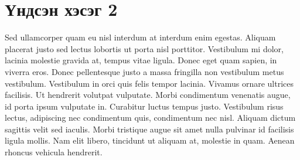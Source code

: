 
\section{Үндсэн хэсэг 2}

Sed ullamcorper quam eu nisl interdum at interdum enim egestas. Aliquam placerat justo sed lectus lobortis ut porta nisl porttitor. Vestibulum mi dolor, lacinia molestie gravida at, tempus vitae ligula. Donec eget quam sapien, in viverra eros. Donec pellentesque justo a massa fringilla non vestibulum metus vestibulum. Vestibulum in orci quis felis tempor lacinia. Vivamus ornare ultrices facilisis. Ut hendrerit volutpat vulputate. Morbi condimentum venenatis augue, id porta ipsum vulputate in. Curabitur luctus tempus justo. Vestibulum risus lectus, adipiscing nec condimentum quis, condimentum nec nisl. Aliquam dictum sagittis velit sed iaculis. Morbi tristique augue sit amet nulla pulvinar id facilisis ligula mollis. Nam elit libero, tincidunt ut aliquam at, molestie in quam. Aenean rhoncus vehicula hendrerit.
